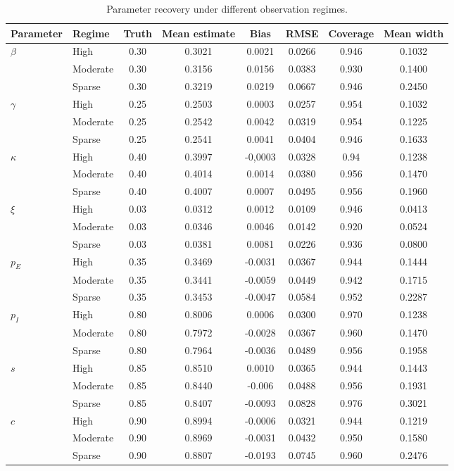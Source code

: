 \documentclass[10pt]{article}
\begin{document}
\begin{table}[ht]
\centering
\caption{Parameter recovery under different observation regimes.}
\label{tab:param-recovery}
\begin{tabular}{llcccccc}
\hline
Parameter	&	Regime	&	Truth	&	Mean estimate	&	Bias	&	RMSE	&	Coverage	&	Mean width	\\
\hline
$\beta$	&	High	&	0.30	&	0.3021	&	0.0021	&	0.0266	&	0.946	&	0.1032	\\
	&	Moderate	&	0.30	&	0.3156	&	0.0156	&	0.0383	&	0.930	&	0.1400	\\
	&	Sparse	&	0.30	&	0.3219	&	0.0219	&	0.0667	&	0.946	&	0.2450	\\ \hline
$\gamma$	&	High	&	0.25	&	0.2503	&	0.0003	&	0.0257	&	0.954	&	0.1032	\\
	&	Moderate	&	0.25	&	0.2542	&	0.0042	&	0.0319	&	0.954	&	0.1225	\\
	&	Sparse	&	0.25	&	0.2541	&	0.0041	&	0.0404	&	0.946	&	0.1633	\\ \hline
$\kappa$	&	High	&	0.40	&	0.3997	&	-0,0003	&	0.0328	&	0.94	&	0.1238	\\
	&	Moderate	&	0.40	&	0.4014	&	0.0014	&	0.0380	&	0.956	&	0.1470	\\
	&	Sparse	&	0.40	&	0.4007	&	0.0007	&	0.0495	&	0.956	&	0.1960	\\ \hline
$\xi$	&	High	&	0.03	&	0.0312	&	0.0012	&	0.0109	&	0.946	&	0.0413	\\
	&	Moderate	&	0.03	&	0.0346	&	0.0046	&	0.0142	&	0.920	&	0.0524	\\
	&	Sparse	&	0.03	&	0.0381	&	0.0081	&	0.0226	&	0.936	&	0.0800	\\ \hline
$p_E$	&	High	&	0.35	&	0.3469	&	-0.0031	&	0.0367	&	0.944	&	0.1444	\\
	&	Moderate	&	0.35	&	0.3441	&	-0.0059	&	0.0449	&	0.942	&	0.1715	\\
	&	Sparse	&	0.35	&	0.3453	&	-0.0047	&	0.0584	&	0.952	&	0.2287	\\ \hline
$p_I$	&	High	&	0.80	&	0.8006	&	0.0006	&	0.0300	&	0.970	&	0.1238	\\
	&	Moderate	&	0.80	&	0.7972	&	-0.0028	&	0.0367	&	0.960	&	0.1470	\\
	&	Sparse	&	0.80	&	0.7964	&	-0.0036	&	0.0489	&	0.956	&	0.1958	\\ \hline
$s$	&	High	&	0.85	&	0.8510	&	0.0010	&	0.0365	&	0.944	&	0.1443	\\
	&	Moderate	&	0.85	&	0.8440	&	-0.006	&	0.0488	&	0.956	&	0.1931	\\
	&	Sparse	&	0.85	&	0.8407	&	-0.0093	&	0.0828	&	0.976	&	0.3021	\\ \hline
$c$	&	High	&	0.90	&	0.8994	&	-0.0006	&	0.0321	&	0.944	&	0.1219	\\ 
	&	Moderate	&	0.90	&	0.8969	&	-0.0031	&	0.0432	&	0.950	&	0.1580	\\
	&	Sparse	&	0.90	&	0.8807	&	-0.0193	&	0.0745	&	0.960	&	0.2476	\\

\hline
\end{tabular}
\end{table}
\end{document}
